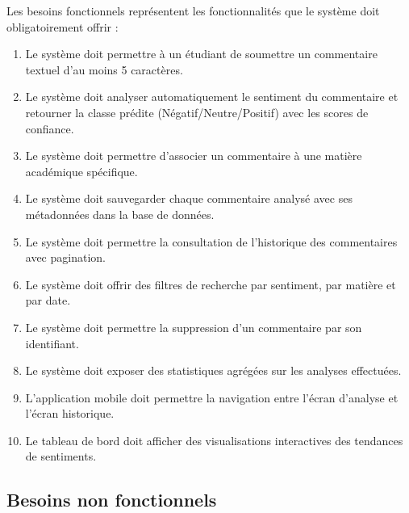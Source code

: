 Les besoins fonctionnels représentent les fonctionnalités que le système
doit obligatoirement offrir :

\begin{enumerate}[label=\textbf{BF\arabic*}., leftmargin=3em]
  \item Le système doit permettre à un étudiant de soumettre un commentaire
        textuel d'au moins 5 caractères.
  \item Le système doit analyser automatiquement le sentiment du commentaire
        et retourner la classe prédite (Négatif/Neutre/Positif) avec les
        scores de confiance.
  \item Le système doit permettre d'associer un commentaire à une matière
        académique spécifique.
  \item Le système doit sauvegarder chaque commentaire analysé avec ses
        métadonnées dans la base de données.
  \item Le système doit permettre la consultation de l'historique des
        commentaires avec pagination.
  \item Le système doit offrir des filtres de recherche par sentiment,
        par matière et par date.
  \item Le système doit permettre la suppression d'un commentaire par
        son identifiant.
  \item Le système doit exposer des statistiques agrégées sur les analyses
        effectuées.
  \item L'application mobile doit permettre la navigation entre l'écran
        d'analyse et l'écran historique.
  \item Le tableau de bord doit afficher des visualisations interactives
        des tendances de sentiments.
\end{enumerate}

\subsection{Besoins non fonctionnels}

